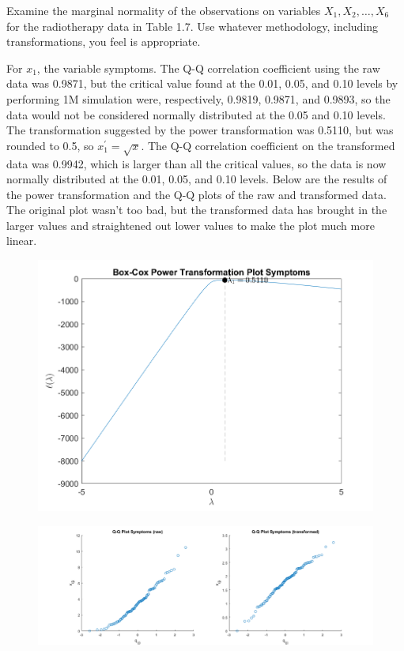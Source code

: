 Examine the marginal normality of the observations on variables $X_{1} , X_{2}, \dots, X_{6}$ for the
radiotherapy data in Table 1.7. Use whatever methodology, including transformations, you feel is appropriate.

For $x_{1}$, the variable symptoms. The Q-Q correlation coefficient using the raw data was 0.9871, but the critical value found at the 0.01, 0.05, and 0.10 levels by performing 1M simulation were, respectively, 0.9819, 0.9871, and 0.9893, so the data would not be considered normally distributed at the 0.05 and 0.10 levels. The transformation suggested by the power transformation was 0.5110, but was rounded to 0.5, so $x_{1}^{\prime} = \sqrt{x}$. The Q-Q correlation coefficient on the transformed data was 0.9942, which is larger than all the critical values, so the data is now normally distributed at the 0.01, 0.05, and 0.10 levels. Below are the results of the power transformation and the Q-Q plots of the raw and transformed data. The original plot wasn't too bad, but the transformed data has brought in the larger values and straightened out lower values to make the plot much more linear.
\begin{center}
    \begin{figure}[H]
        \centering
        \includegraphics[scale=0.6]{./matlab/chapter-4/sol4.32.power.1.png}
    \end{figure}
\end{center}

\begin{center}
    \begin{figure}[H]
        \centering
        \includegraphics[scale=0.4]{./matlab/chapter-4/sol4.32.qq.1.png}
    \end{figure}
\end{center}

